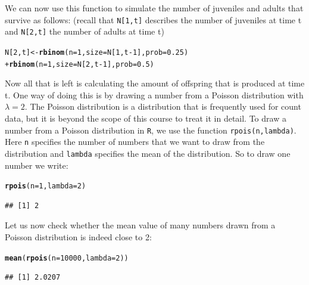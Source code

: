 \documentclass{article}\usepackage[]{graphicx}\usepackage[]{color}
\makeatletter
\newcommand{\hlnum}[1]{\textcolor[rgb]{0.686,0.059,0.569}{#1}}%
\newcommand{\hlopt}[1]{\textcolor[rgb]{0,0,0}{#1}}%
\newcommand{\hlstd}[1]{\textcolor[rgb]{0.345,0.345,0.345}{#1}}%
\newcommand{\hlkwb}[1]{\textcolor[rgb]{0.69,0.353,0.396}{#1}}%
\newcommand{\hlkwc}[1]{\textcolor[rgb]{0.333,0.667,0.333}{#1}}%
\newcommand{\hlkwd}[1]{\textcolor[rgb]{0.737,0.353,0.396}{\textbf{#1}}}%
\newenvironment{kframe}{%
 \def\at@end@of@kframe{}%
 \ifinner\ifhmode%
  \def\at@end@of@kframe{\end{minipage}}%
  \begin{minipage}{\columnwidth}%
 \fi\fi%
 \def\FrameCommand##1{\hskip\@totalleftmargin \hskip-\fboxsep
 \colorbox{shadecolor}{##1}\hskip-\fboxsep
     \hskip-\linewidth \hskip-\@totalleftmargin \hskip\columnwidth}%
 \MakeFramed {\advance\hsize-\width
   \@totalleftmargin\z@ \linewidth\hsize
   \@setminipage}}%
 {\par\unskip\endMakeFramed%
 \at@end@of@kframe}
\newenvironment{knitrout}{}{} %
\makeatother
\begin{document}
We can now use this function to simulate the number of juveniles and adults that survive as follows:
(recall that \texttt{N[1,t]} describes the number of juveniles at time t and \texttt{N[2,t]} the number of adults at time t)
\begin{knitrout}
\color{fgcolor}\begin{kframe}
\begin{alltt}
\hlstd{N[}\hlnum{2}\hlstd{,t]}\hlkwb{<-}\hlkwd{rbinom}\hlstd{(}\hlkwc{n}\hlstd{=}\hlnum{1}\hlstd{,}\hlkwc{size}\hlstd{=N[}\hlnum{1}\hlstd{,t}\hlopt{-}\hlnum{1}\hlstd{],}\hlkwc{prob}\hlstd{=}\hlnum{0.25}\hlstd{)}
        \hlopt{+} \hlkwd{rbinom}\hlstd{(}\hlkwc{n}\hlstd{=}\hlnum{1}\hlstd{,}\hlkwc{size}\hlstd{=N[}\hlnum{2}\hlstd{,t}\hlopt{-}\hlnum{1}\hlstd{],}\hlkwc{prob}\hlstd{=}\hlnum{0.5}\hlstd{)}
\end{alltt}
\end{kframe}
\end{knitrout}
Now all that is left is calculating the amount of offspring that is produced at time t. One way of doing this is by drawing a number from a Poisson distribution with $\lambda=2$. The Poisson distribution is a distribution that is frequently used for count data, but it is beyond the scope of this course to treat it in detail. To draw a number from a Poisson distribution in \texttt{R}, we use the function \texttt{rpois(n,lambda)}. Here \texttt{n} specifies the number of numbers that we want to draw from the distribution and \texttt{lambda} specifies the mean of the distribution. So to draw one number we write:
\begin{knitrout}
\color{fgcolor}\begin{kframe}
\begin{alltt}
\hlkwd{rpois}\hlstd{(}\hlkwc{n}\hlstd{=}\hlnum{1}\hlstd{,}\hlkwc{lambda}\hlstd{=}\hlnum{2}\hlstd{)}
\end{alltt}
\begin{verbatim}
## [1] 2
\end{verbatim}
\end{kframe}
\end{knitrout}
Let us now check whether the mean value of many numbers drawn from a Poisson distribution is indeed close to 2:
\begin{knitrout}
\color{fgcolor}\begin{kframe}
\begin{alltt}
\hlkwd{mean}\hlstd{(}\hlkwd{rpois}\hlstd{(}\hlkwc{n}\hlstd{=}\hlnum{10000}\hlstd{,}\hlkwc{lambda}\hlstd{=}\hlnum{2}\hlstd{))}
\end{alltt}
\begin{verbatim}
## [1] 2.0207
\end{verbatim}
\end{kframe}
\end{knitrout}
\end{document}

